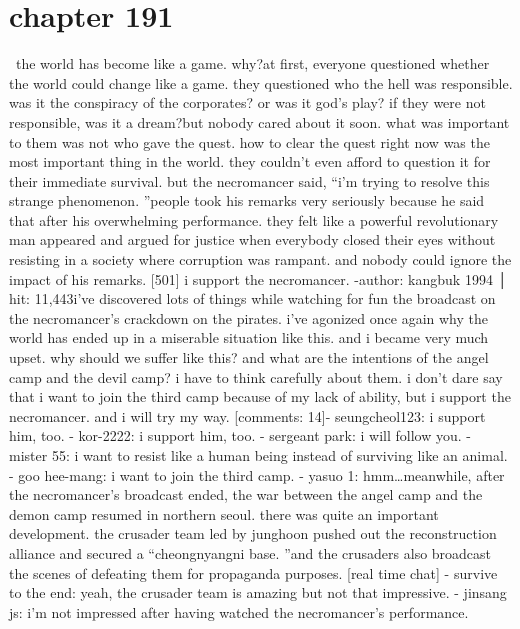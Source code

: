 \section{chapter 191}






 the world has become like a game.
why?at first, everyone questioned whether the world could change like a game.
 they questioned who the hell was responsible.
 was it the conspiracy of the corporates? or was it god’s play? if they were not responsible, was it a dream?but nobody cared about it soon.
what was important to them was not who gave the quest.
 how to clear the quest right now was the most important thing in the world.
they couldn’t even afford to question it for their immediate survival.
but the necromancer said, “i’m trying to resolve this strange phenomenon.
”people took his remarks very seriously because he said that after his overwhelming performance.
 they felt like a powerful revolutionary man appeared and argued for justice when everybody closed their eyes without resisting in a society where corruption was rampant.
and nobody could ignore the impact of his remarks.
[501] i support the necromancer.
-author: kangbuk 1994 │ hit: 11,443i’ve discovered lots of things while watching for fun the broadcast on the necromancer’s crackdown on the pirates.
 i’ve agonized once again why the world has ended up in a miserable situation like this.
 and i became very much upset.
 why should we suffer like this? and what are the intentions of the angel camp and the devil camp? i have to think carefully about them.
 i don’t dare say that i want to join the third camp because of my lack of ability, but i support the necromancer.
 and i will try my way.
[comments: 14]- seungcheol123: i support him, too.
- kor-2222: i support him, too.
- sergeant park: i will follow you.
- mister 55: i want to resist like a human being instead of surviving like an animal.
- goo hee-mang: i want to join the third camp.
- yasuo 1: hmm…meanwhile, after the necromancer’s broadcast ended, the war between the angel camp and the demon camp resumed in northern seoul.
there was quite an important development.
 the crusader team led by junghoon pushed out the reconstruction alliance and secured a “cheongnyangni base.
”and the crusaders also broadcast the scenes of defeating them for propaganda purposes.
[real time chat]
- survive to the end: yeah, the crusader team is amazing but not that impressive.
- jinsang js: i’m not impressed after having watched the necromancer’s performance.
